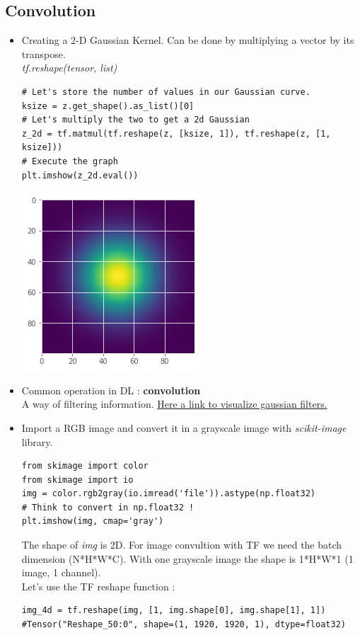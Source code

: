 \documentclass[12pt,a4paper]{article}
\begin{document}
\subsection{Convolution}
\begin{itemize}
\item Creating a 2-D Gaussian Kernel. Can be done by multiplying a vector by its transpose.\\
\textit{tf.reshape(tensor, list)}
\begin{lstlisting}
# Let's store the number of values in our Gaussian curve.
ksize = z.get_shape().as_list()[0]
# Let's multiply the two to get a 2d Gaussian
z_2d = tf.matmul(tf.reshape(z, [ksize, 1]), tf.reshape(z, [1, ksize]))
# Execute the graph
plt.imshow(z_2d.eval())
\end{lstlisting}
\includegraphics[scale=0.5]{gaussianKernel}
\item Common operation in DL : \textbf{convolution}\\
A way of filtering information. \href{http://setosa.io/ev/image-kernels/}{Here a link to visualize gaussian filters.}
\item Import a RGB image and convert it in a grayscale image with \textit{scikit-image} library.
\begin{lstlisting}
from skimage import color
from skimage import io
img = color.rgb2gray(io.imread('file')).astype(np.float32)
# Think to convert in np.float32 !
plt.imshow(img, cmap='gray')
\end{lstlisting}
The shape of \textit{img} is 2D. For image convultion with TF we need the batch dimension (N*H*W*C). With one grayscale image the shape is 1*H*W*1 (1 image, 1 channel).\\
Let's use the TF reshape function :
\begin{lstlisting}
img_4d = tf.reshape(img, [1, img.shape[0], img.shape[1], 1])
#Tensor("Reshape_50:0", shape=(1, 1920, 1920, 1), dtype=float32)

\end{lstlisting}
\end{itemize}
\end{document}
